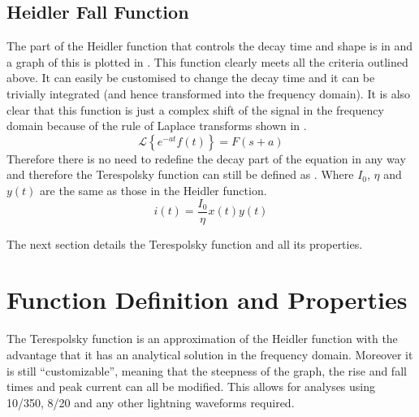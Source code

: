 \subsection{Heidler Fall Function}
\label{sub:heidler_fall_function}

The part of the Heidler function that controls the decay time and shape is in  and a graph of this is plotted in . This function clearly meets all the criteria outlined above. It can easily be customised to change the decay time and it can be trivially integrated (and hence transformed into the frequency domain).
It is also clear that this function is just a complex shift of the signal in the frequency domain because of the rule of Laplace transforms shown in  \cite{bkSST,bkControl}.
\begin{equation}
	\mathcal{L} \left \{ e^{-at}f\left ( t \right ) \right \} = F \left (s + a \right )
	\label{eqn:laplaceComplexShift}
\end{equation}
Therefore there is no need to redefine the decay part of the equation in any way and therefore the Terespolsky function can still be defined as . Where $I_0$, $\eta$ and $y(t)$ are the same as those in the Heidler function.
\begin{equation}
i(t) = \frac{I_0}{\eta} x \left( t \right) y \left( t \right)
\label{eqn:PreTFSmall}
\end{equation}

The next section details the Terespolsky function and all its properties.


\section{Function Definition and Properties}
\label{sec:function_definition_and_properties}

The Terespolsky function is an approximation of the Heidler function with the advantage that it has an analytical solution in the frequency domain. Moreover it is still ``customizable'', meaning that the steepness of the graph, the rise and fall times and peak current can all be modified. This allows for analyses using 10/350, 8/20 and any other lightning waveforms required.

